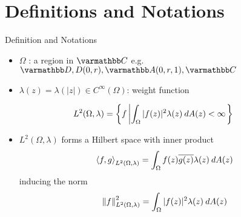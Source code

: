 \documentclass{reu_beamer}
\begin{document}
\section{Definitions and Notations}
\begin{frame}{Definition and Notations}
\begin{itemize}
    \item $\Omega $ : a region in \(\C\) e.g. $ \mathbb{D},D(0,r),\mathbb{A}(0,r,1),\C$
    \item $\lambda(z)=\lambda(|z|)\in C^{\infty}(\Omega)$: weight function
\end{itemize} 
\begin{definition}
    \begin{align*}
        L^{2}(\Omega,\lambda) &= \left\{f \left| \int_{\Omega}|f(z)|^2\lambda(z) \: d A(z) < \infty\right.\right\}
    \end{align*}
\end{definition}

\begin{itemize}
    \item \(L^2(\Omega, \lambda)\) forms a Hilbert space with inner product
    \[\left\langle f, g\right\rangle_{L^2(\Omega, \lambda)} = \int_\Omega f(z) \overline{g(z)} \lambda(z)\: dA(z)\]
    inducing the norm
    \[\left\Vert f \right\Vert_{L^{2}(\Omega,\lambda)}^2 = \int_{\Omega}|f(z)|^2\lambda(z)\:dA(z)\]
\end{itemize}
\end{frame}
\end{document}
